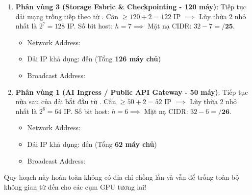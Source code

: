\begin{itemize}
\begin{enumerate}
    \item \textbf{Phân vùng 3 (Storage Fabric \& Checkpointing - 120 máy)}:
    Tiếp tục dải mạng trống tiếp theo từ .
    Cần $\ge 120 + 2 = 122$ IP $\implies$ Lũy thừa 2 nhỏ nhất là $2^7 = 128$ IP.
    Số bit host: $h = 7 \implies$ Mặt nạ CIDR: $32 - 7 = \mathbf{/25}$.
    \begin{itemize}
      \item Network Address: 
      \item Dải IP khả dụng:  đến  (Tổng \textbf{126 máy chủ})
      \item Broadcast Address: 
    \end{itemize}
    
    \item \textbf{Phân vùng 1 (AI Ingress / Public API Gateway - 50 máy)}:
    Tiếp tục nửa sau của dải  bắt đầu từ .
    Cần $\ge 50 + 2 = 52$ IP $\implies$ Lũy thừa 2 nhỏ nhất là $2^6 = 64$ IP.
    Số bit host: $h = 6 \implies$ Mặt nạ CIDR: $32 - 6 = \mathbf{/26}$.
    \begin{itemize}
      \item Network Address: 
      \item Dải IP khả dụng:  đến  (Tổng \textbf{62 máy chủ})
      \item Broadcast Address: 
    \end{itemize}
  \end{enumerate}
  Quy hoạch này hoàn toàn không có địa chỉ chồng lấn và vẫn để trống toàn bộ không gian từ  đến  cho các cụm GPU tương lai!
\end{itemize}

